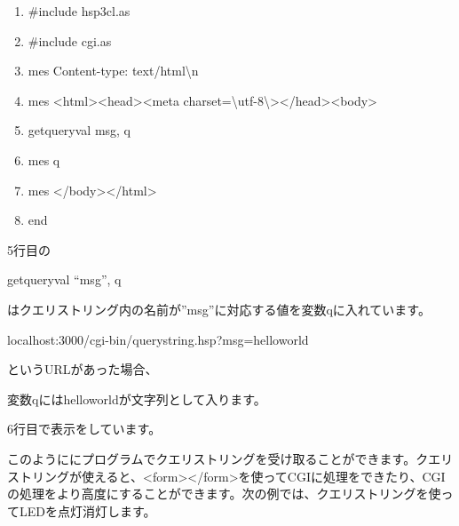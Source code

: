 \documentclass[a4paper,12pt,dvipdfmx]{jarticle}
\begin{document}
\centering
\begin{boxedminipage}{16.233cm}
	\begin{enumerate}
	\baselineskip 10pt
	\setlength{\itemsep}{0cm}
	\item\#include {\textquotedbl}hsp3cl.as{\textquotedbl}

	\item\#include {\textquotedbl}cgi.as{\textquotedbl}

	\item mes {\textquotedbl}Content-type: text/html{\textbackslash}n{\textquotedbl}

	\item mes {\textquotedbl}{\textless}html{\textgreater}{\textless}head{\textgreater}{\textless}meta
		charset={\textbackslash}{\textquotedbl}utf-8{\textbackslash}{\textquotedbl}{\textgreater}{\textless}/head{\textgreater}{\textless}body{\textgreater}{\textquotedbl}

	\item getqueryval {\textquotedbl}msg{\textquotedbl}, q

	\item mes q

	\item mes {\textquotedbl}{\textless}/body{\textgreater}{\textless}/html{\textgreater}{\textquotedbl}

	\item end
	\end{enumerate}
\end{boxedminipage}
\flushleft


\bigskip


\bigskip

5行目の

getqueryval “msg”, q

はクエリストリング内の名前が”msg”に対応する値を変数qに入れています。

localhost:3000/cgi-bin/querystring.hsp?msg=helloworld

というURLがあった場合、

変数qにはhelloworldが文字列として入ります。

6行目で表示をしています。

このようににプログラムでクエリストリングを受け取ることができます。クエリストリングが使えると、{\textless}form{\textgreater}{\textless}/form{\textgreater}を使ってCGIに処理をできたり、CGIの処理をより高度にすることができます。次の例では、クエリストリングを使ってLEDを点灯消灯します。
\end{document}
